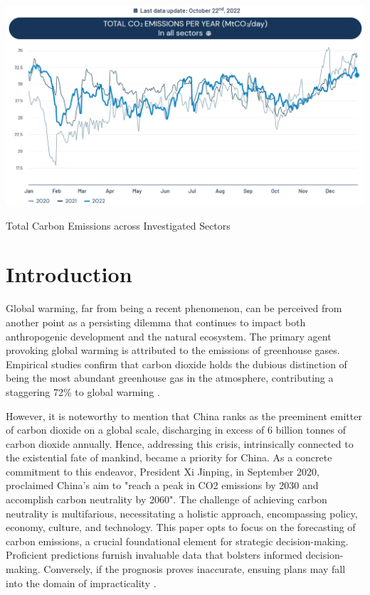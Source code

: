 \documentclass[sigconf, authordraft]{acmart}
\begin{document}
	\begin{teaserfigure}
		\includegraphics[width=\textwidth]{figures/total_carbon_emissions.png}
		\caption{Total Carbon Emissions across Investigated Sectors}
		\Description{} \label{fig:teaser}
	\end{teaserfigure}

	\maketitle


	\section{Introduction}
	Global warming, far from being a recent phenomenon, can be perceived from another
	point as a persisting dilemma that continues to impact both anthropogenic development
	and the natural ecosystem. The primary agent provoking global warming is
	attributed to the emissions of greenhouse gases. Empirical studies confirm that
	carbon dioxide holds the dubious distinction of being the most abundant greenhouse
	gas in the atmosphere, contributing a staggering 72\% to global warming \cite{li2021-pricing}.

	However, it is noteworthy to mention that China ranks as the preeminent
	emitter of carbon dioxide on a global scale, discharging in excess of 6 billion
	tonnes of carbon dioxide annually. Hence, addressing this crisis,
	intrinsically connected to the existential fate of mankind, became a priority for
	China. As a concrete commitment to this endeavor, President Xi Jinping, in
	September 2020, proclaimed China's aim to "reach a peak in CO2 emissions by
	2030 and accomplish carbon neutrality by 2060". The challenge of achieving
	carbon neutrality is multifarious, necessitating a holistic approach,
	encompassing policy, economy, culture, and technology. This paper opts to
	focus on the forecasting of carbon emissions, a crucial foundational element for
	strategic decision-making. Proficient predictions furnish invaluable data that
	bolsters informed decision-making. Conversely, if the prognosis proves
	inaccurate, ensuing plans may fall into the domain of impracticality \cite{-forecasting}.
\end{document}
